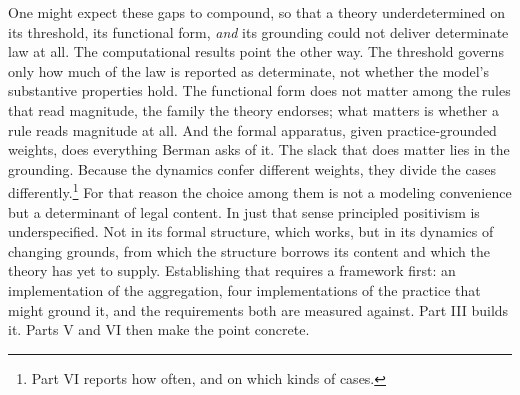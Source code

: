 One might expect these gaps to compound, so that a theory underdetermined
on its threshold, its functional form, \textit{and} its grounding could
not deliver determinate law at all. The computational results point the
other way. The threshold governs only how much of the law is reported as
determinate, not whether the model's substantive properties hold. The functional form does not matter among the rules that read magnitude, the
family the theory endorses; what matters is whether a rule reads magnitude at
all. And the formal apparatus, given practice-grounded weights, does
everything Berman asks of it. The slack that does matter lies in the
grounding. Because the dynamics confer different weights, they divide
the cases differently.\footnote{Part VI reports how often, and on which
kinds of cases.} For that reason the choice among them is not a modeling convenience but a
determinant of legal content. In just that sense principled positivism is
underspecified. Not in its formal structure, which works, but in its
dynamics of changing grounds, from which the structure borrows its content
and which the theory has yet to supply. Establishing that requires a
framework first: an implementation of the aggregation, four implementations
of the practice that might ground it, and the requirements both are
measured against. Part III builds it. Parts V and VI then make the point
concrete.
